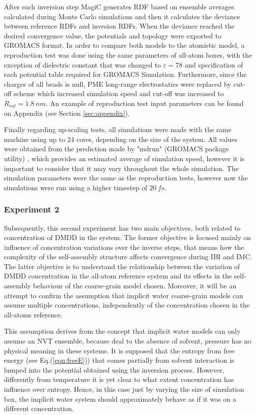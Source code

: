 \documentclass[10pt,a4paper,twoside]{article}
\begin{document}
 After each inversion step MagiC generates RDF based on ensemble averages calculated during Monte Carlo simulations and then it calculates the deviance between reference RDFs and invesion RDFs. When the deviance reached the desired convergence value, the potentials and topology were exported to GROMACS format. In order to compare both models to the atomistic model, a reproduction test was done using the same parameters of all-atom boxes, with the exception of dielectric constant that was changed to $\varepsilon = 78$ and specification of each potential table required for GROMACS Simulation. Furthermore, since the charges of all beads is null, PME long-range electrostatics were replaced by cut-off scheme which increased simulation speed and cut-off was increased to $R_{cut} = 1.8 \ nm$. An example of reproduction test input parameters can be found on Appendix (see Section \ref{sec:appendix}).
 
 Finally regarding up-scaling tests, all simulations were made with the same machine using up to 24 cores, depending on the size of the system. All values were obtained from the prediction made by "mdrun" (GROMACS package utility) \cite{gromanual}, which provides an estimated average of simulation speed, however it is important to consider that it may vary throughout the whole simulation. The simulation parameters were the same as the reproduction tests, however now the simulations were run using a higher timestep of $20\ fs$. 

\subsubsection*{Experiment 2}
 Subsequently, this second experiment has two main objectives, both related to concentration of DMDD in the system. The former objective is focused mainly on influence of concentration variations over the inverse steps, that means how the complexity of the self-assembly 
 structure affects convergence during IBI and IMC. The latter objective is to understand the relationship between the variation of DMDD concentration in the all-atom reference system and its effects in the self-assembly behaviour of the coarse-grain model chosen. Moreover, it will be an attempt to confirm the assumption that implicit water coarse-grain models can assume multiple concentrations, independently of the concentration chosen in the all-atoms reference.
 
 This assumption derives from the concept that implicit water models can only assume an NVT ensemble, because deal to the absence of solvent, pressure has no physical meaning in these systems. It is supposed that the entropy from free energy (see Eq.(\ref{eqn:freeE})) that comes partially from solvent interaction is lumped into the potential obtained using the inversion process. However,   differently from temperature it is yet clear to what extent concentration has influence over entropy. Hence, in this case just by varying the size of simulation box, the implicit water system should approximately behave as if it was on a different concentration.
  
\end{document}
